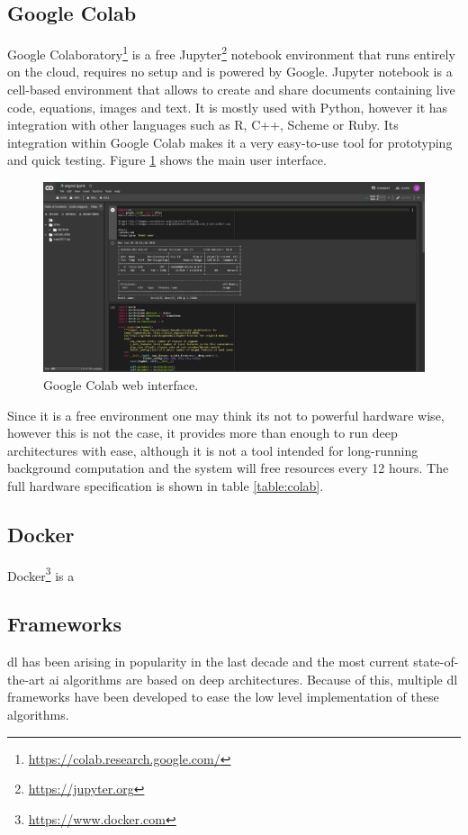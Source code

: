 \subsection{Google Colab}
\label{sec:colab}
Google Colaboratory\footnote{\url{https://colab.research.google.com/}} is a free Jupyter\footnote{\url{https://jupyter.org}} notebook environment that runs entirely on the cloud, requires no setup and is powered by Google. Jupyter notebook is a cell-based environment that allows to create and share documents containing live code\texttt{}, equations, images and text. It is mostly used with Python, however it has integration with other languages such as R, C++, Scheme or Ruby. Its integration within Google Colab makes it a very easy-to-use tool for prototyping and quick testing. Figure \ref{fig:colab} shows the main user interface.

\begin{figure}
	\centering
	\includegraphics[width=0.8\linewidth]{archivos/colab}
	\caption{Google Colab web interface.}
	\label{fig:colab}
\end{figure}

Since it is a free environment one may think its not to powerful hardware wise, however this is not the case, it provides more than enough to run deep architectures with ease, although it is not a tool intended for long-running background computation and the system will free resources every 12 hours.
The full hardware specification is shown in table \ref{table:colab}.

\subsection{Docker}
Docker\footnote{\url{https://www.docker.com}} is a 

\subsection{Frameworks}
\gls{dl} has been arising in popularity in the last decade and the most current state-of-the-art \gls{ai} algorithms are based on deep architectures. Because of this, multiple \gls{dl} frameworks have been developed to ease the low level implementation of these algorithms.

